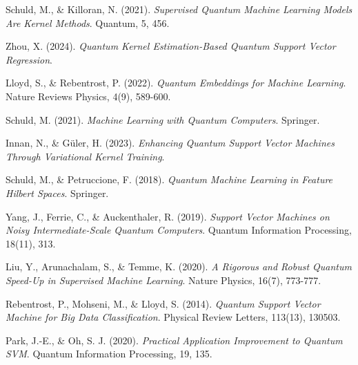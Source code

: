 \documentclass[12pt]{article}
\begin{document}
\begin{thebibliography}{9}
    Schuld, M., \& Killoran, N. (2021). \textit{Supervised Quantum Machine Learning Models Are Kernel Methods}. Quantum, 5, 456.
    
    Zhou, X. (2024). \textit{Quantum Kernel Estimation-Based Quantum Support Vector Regression}.
    
    Lloyd, S., \& Rebentrost, P. (2022). \textit{Quantum Embeddings for Machine Learning}. Nature Reviews Physics, 4(9), 589-600.
    
    Schuld, M. (2021). \textit{Machine Learning with Quantum Computers}. Springer.
    
    Innan, N., \& Güler, H. (2023). \textit{Enhancing Quantum Support Vector Machines Through Variational Kernel Training}.
    
    Schuld, M., \& Petruccione, F. (2018). \textit{Quantum Machine Learning in Feature Hilbert Spaces}. Springer.
    
    Yang, J., Ferrie, C., \& Auckenthaler, R. (2019). \textit{Support Vector Machines on Noisy Intermediate-Scale Quantum Computers}. Quantum Information Processing, 18(11), 313.
    
    Liu, Y., Arunachalam, S., \& Temme, K. (2020). \textit{A Rigorous and Robust Quantum Speed-Up in Supervised Machine Learning}. Nature Physics, 16(7), 773-777.
    
    Rebentrost, P., Mohseni, M., \& Lloyd, S. (2014). \textit{Quantum Support Vector Machine for Big Data Classification}. Physical Review Letters, 113(13), 130503.
    
    Park, J.-E., \& Oh, S. J. (2020). \textit{Practical Application Improvement to Quantum SVM}. Quantum Information Processing, 19, 135.
    
    







\end{thebibliography}
\end{document}
